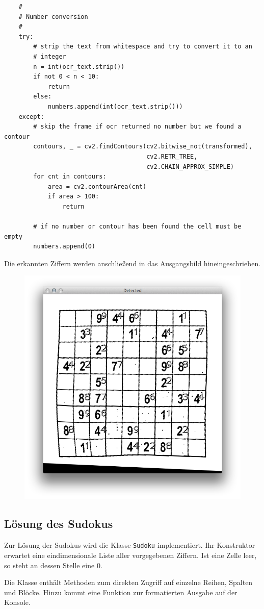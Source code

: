 \begin{lstlisting}
    #
    # Number conversion
    #
    try:
        # strip the text from whitespace and try to convert it to an
        # integer
        n = int(ocr_text.strip())
        if not 0 < n < 10:
            return
        else:
            numbers.append(int(ocr_text.strip()))
    except:
        # skip the frame if ocr returned no number but we found a contour
        contours, _ = cv2.findContours(cv2.bitwise_not(transformed),
                                       cv2.RETR_TREE,
                                       cv2.CHAIN_APPROX_SIMPLE)
        for cnt in contours:
            area = cv2.contourArea(cnt)
            if area > 100:
                return

        # if no number or contour has been found the cell must be empty
        numbers.append(0)
\end{lstlisting}

Die erkannten Ziffern werden anschließend in das Ausgangsbild hineingeschrieben.

\begin{figure}[H]
    \begin{center}
        \includegraphics[width=.5\textwidth]{Abbildungen/detected}
    \end{center}
\end{figure}


\subsection{Lösung des Sudokus}
Zur Lösung der Sudokus wird die Klasse \lstinline{Sudoku} implementiert.
Ihr Konstruktor erwartet eine eindimensionale Liste aller vorgegebenen Ziffern.
Ist eine Zelle leer, so steht an dessen Stelle eine $0$.

Die Klasse enthält Methoden zum direkten Zugriff auf einzelne Reihen, Spalten und Blöcke. Hinzu kommt eine Funktion zur formatierten Ausgabe auf der Konsole.

